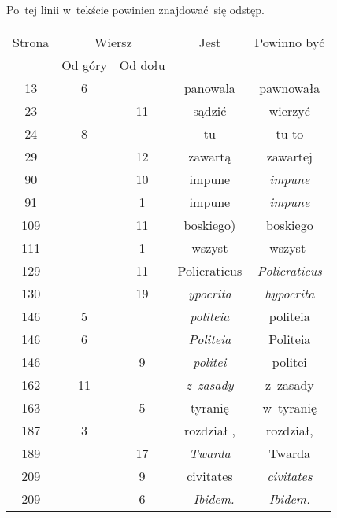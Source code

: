 \documentclass[a4paper,11pt]{article}
\begin{document}
\noindent
{} Po~tej linii w~tekście powinien znajdować~się odstęp.

\vspace{\spaceFour}





\newpage



\begin{center}

  \begin{tabular}{|c|c|c|c|c|}
    \hline
    Strona & \multicolumn{2}{c|}{Wiersz} & Jest
                              & Powinno być \\ \cline{2-3}
    & Od góry & Od dołu & & \\
    \hline
    \hphantom{0}13 & \hphantom{0}6 & & panowala & pawnowała \\
    \hphantom{0}23 & & 11 & sądzić & wierzyć \\
    \hphantom{0}24 & \hphantom{0}8 & & tu & tu to \\
    \hphantom{0}29 & & 12 & zawartą & zawartej \\
    \hphantom{0}90 & & 10 & impune & \textit{impune} \\
    \hphantom{0}91 & & \hphantom{0}1 & impune & \textit{impune} \\
    109 & & 11 & boskiego) & boskiego \\
    111 & & \hphantom{0}1 & wszyst & wszyst- \\
    129 & & 11 & Policraticus & \textit{Policraticus} \\
    130 & & 19 & \textit{ypocrita} & \textit{hypocrita} \\
    146 & \hphantom{0}5 & & \textit{politeia} & politeia \\
    146 & \hphantom{0}6 & & \textit{Politeia}& Politeia \\
    146 & & \hphantom{0}9 & \textit{politei} & politei \\
    162 & 11 & & \textit{z~zasady} & z~zasady \\
    163 & & \hphantom{0}5 & tyranię & w~tyranię \\
    187 & \hphantom{0}3 & & rozdział , & rozdział, \\
    189 & & 17 & \textit{Twarda} & Twarda \\
    209 & & \hphantom{0}9 & civitates & \textit{civitates} \\
    209 & & \hphantom{0}6 & - \textit{Ibidem.} & \textit{Ibidem.} \\

\end{tabular}
\end{center}
\end{document}
